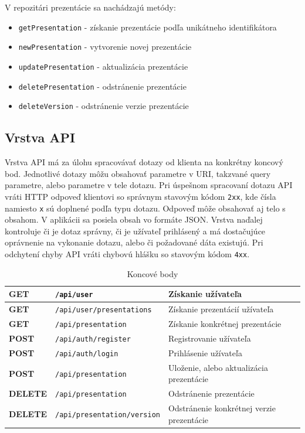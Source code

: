 \vspace{5mm}
V repozitári prezentácie sa nachádzajú metódy: 
    \begin{itemize}
        \item\texttt{getPresentation} - získanie prezentácie podľa unikátneho identifikátora
        \item\texttt{newPresentation} - vytvorenie novej prezentácie
        \item\texttt{updatePresentation} - aktualizácia prezentácie
        \item\texttt{deletePresentation} - odstránenie prezentácie
        \item\texttt{deleteVersion} - odstránenie verzie prezentácie
    \end{itemize}
    
    \subsection*{Vrstva API}
Vrstva API má za úlohu spracovávať dotazy od klienta na konkrétny koncový bod. Jednotlivé dotazy môžu obsahovať parametre v URI, takzvané query parametre, alebo parametre v tele dotazu. Pri úspešnom spracovaní dotazu API vráti HTTP odpoveď klientovi so správnym stavovým kódom \texttt{2xx}, kde čísla namiesto \texttt{x} sú doplnené podľa typu dotazu. Odpoveď môže obsahovať aj telo s obsahom. V aplikácii sa posiela obsah vo formáte JSON. Vrstva naďalej kontroluje či je dotaz správny, či je užívateľ prihlásený a má dostačujúce oprávnenie na vykonanie dotazu, alebo či požadované dáta existujú. Pri odchytení chyby API vráti chybovú hlášku so stavovým kódom \texttt{4xx}.

\begin{table}[H]
    \centering
    \caption{Koncové body}
    \label{table:endpoints}
    \begin{tabular}{ |>{\centering\arraybackslash}m{18mm}|p{50mm}|p{70mm}|}
    \hline
    \textbf{GET} & \texttt{/api/user} & Získanie užívateľa  \\
    \hline
    \textbf{GET} & \texttt{/api/user/presentations} & Získanie prezentácií užívateľa  \\
    \hline
    \textbf{GET} & \texttt{/api/presentation} & Získanie konkrétnej prezentácie  \\
    \hline
    \textbf{POST} & \texttt{/api/auth/register} & Registrovanie užívateľa \\
    \hline
    \textbf{POST} & \texttt{/api/auth/login} & Prihlásenie užívateľa \\
    \hline
    \textbf{POST} & \texttt{/api/presentation} & Uloženie, alebo aktualizácia prezentácie  \\
    \hline
    \textbf{DELETE} & \texttt{/api/presentation} & Odstránenie prezentácie  \\
    \hline
    \textbf{DELETE} & \texttt{/api/presentation/version} & Odstránenie konkrétnej verzie prezentácie \\
    \hline
    \end{tabular}
\end{table}
